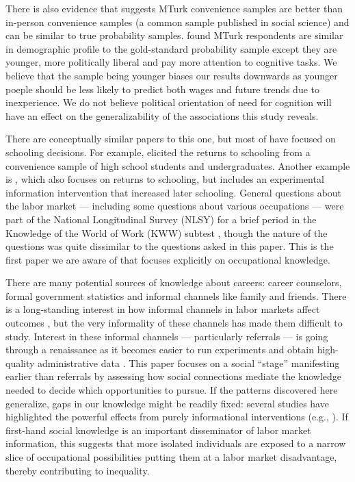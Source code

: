 \documentclass[12pt]{article}
\begin{document}
There is also evidence that suggests MTurk convenience samples are better than in-person convenience samples (a common sample published in social science) and can be similar to true probability samples. \citet{Berinsky2012} found MTurk respondents are similar in demographic profile to the gold-standard probability sample except they are younger, more politically liberal and pay more attention to cognitive tasks. We believe that the sample being younger biases our results downwards as younger poeple should be less likely to predict both wages and future trends due to inexperience. We do not believe political orientation of need for cognition will have an effect on the generalizability of the associations this study reveals.

There are conceptually similar papers to this one, but most of have focused on schooling decisions.  
For example, \cite{dominitz1996} elicited the returns to schooling from a convenience sample of high school students and undergraduates. 
Another example is \cite{jensen2010perceived}, which also focuses on
returns to schooling, but includes an experimental information intervention that increased later schooling.   
General questions about the labor market --- including some questions about various occupations --- were part of the National Longitudinal Survey (NLSY) for a brief period in the Knowledge of the World of Work (KWW) subtest \citep{kohen1975}, though the nature of the questions was quite dissimilar to the questions asked in this paper. 
This is the first paper we are aware of that focuses explicitly on occupational knowledge.

There are many potential sources of knowledge about careers: career counselors, formal government statistics and informal channels like family and friends. 
There is a long-standing interest in how informal channels in labor markets affect outcomes \citep{rees1966information, stigler1962information}, but the very informality of these channels has made them difficult to study. 
Interest in these informal channels --- particularly referrals --- is going through a renaissance as it becomes easier to run experiments \citep{pallais2013referential} and obtain high-quality administrative data \citep{burks2013value}.   
This paper focuses on a social ``stage'' manifesting earlier than referrals by assessing how social connections mediate the knowledge needed to decide which opportunities to pursue.  
If the patterns discovered here generalize, gaps in our knowledge might be readily fixed: 
several studies have highlighted the powerful effects from purely informational interventions (e.g., \citealp{dupas2009teenagers, card2010inequality}).
If first-hand social knowledge is an important disseminator of labor market information, this suggests that more isolated individuals are exposed to a narrow slice of occupational possibilities putting them at a labor market disadvantage, thereby contributing to inequality. 
\end{document}

